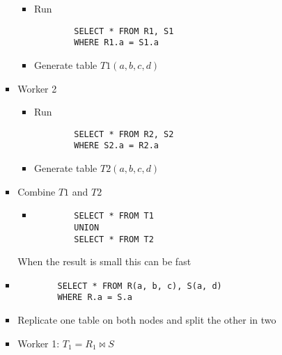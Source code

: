 \begin{itemize}
\begin{itemize}
\begin{itemize}
\begin{itemize}
                                \begin{itemize}
                                    \item Run
        \begin{verbatim}
        SELECT * FROM R1, S1
        WHERE R1.a = S1.a
        \end{verbatim}
                                    \item Generate table $T1(a, b, c, d)$
                                \end{itemize}
                            \item Worker 2
                                \begin{itemize}
                                    \item Run
        \begin{verbatim}
        SELECT * FROM R2, S2
        WHERE S2.a = R2.a
        \end{verbatim}
                                    \item Generate table $T2(a, b, c, d)$
                                \end{itemize}
                            \item Combine $T1$ and $T2$
                                \begin{itemize}
                                    \item
        \begin{verbatim}
        SELECT * FROM T1
        UNION
        SELECT * FROM T2
        \end{verbatim}
                                \end{itemize}
                                \ipro When the result is small this can be fast
                        \end{itemize}
                        \begin{itemize}
                            \item 
        \begin{verbatim}
        SELECT * FROM R(a, b, c), S(a, d)
        WHERE R.a = S.a
        \end{verbatim}
                            \item Replicate one table on both nodes and split the other in two
                            \item Worker 1: $T_1 = R_1 \bowtie S$

\end{itemize}
\end{itemize}
\end{itemize}
\end{itemize}

